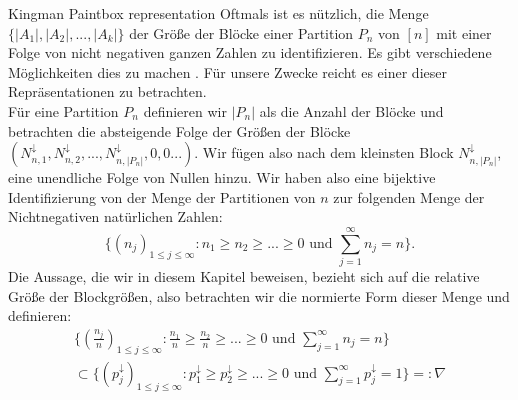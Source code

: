 \begin{section}{Kingman Paintbox representation}
Oftmals ist es nützlich, die Menge $\{|A_1|,|A_2|,...,|A_k|\}$ der Größe der Blöcke einer Partition $P_n$ von $[n]$ mit einer Folge von nicht negativen ganzen Zahlen zu identifizieren. Es gibt verschiedene Möglichkeiten dies zu machen \cite[Seite 15]{pitman2006combinatorial}. Für unsere Zwecke reicht es einer dieser Repräsentationen zu betrachten.
\\
Für eine Partition $P_n$ definieren wir $|P_n|$ als die Anzahl der Blöcke und betrachten die absteigende Folge der Größen der Blöcke $(N^\downarrow_{n,1},N^\downarrow_{n,2},...,N^\downarrow_{n,|P_n|},0,0...)$. Wir fügen also nach dem kleinsten Block $N^\downarrow_{n,|P_n|}$, eine unendliche Folge von Nullen hinzu. Wir haben also eine bijektive Identifizierung von der Menge der Partitionen von $n$ zur folgenden Menge der Nichtnegativen natürlichen Zahlen:
\[
 \{(n_j)_{1\leq j \leq \infty}: n_1 \geq n_2 \geq ... \geq 0 \text{ und } \sum_{j=1}^{\infty}{n_j} = n\}.
\]
Die Aussage, die wir in diesem Kapitel beweisen, bezieht sich auf die relative Größe der Blockgrößen, also betrachten wir die normierte Form dieser Menge und definieren: 
\begin{align}
 \{(\frac{n_j}{n})_{1\leq j \leq \infty}: \frac{n_1}{n} \geq \frac{n_2}{n} \geq ... \geq 0 \text{ und } \sum_{j=1}^{\infty}{n_j} = n\}\\
 \subset
  \{(p_j^{\downarrow})_{1\leq j \leq \infty}: p_1^{\downarrow} \geq p_2^{\downarrow} \geq ... \geq 0 \text{ und } \sum_{j=1}^{\infty}{p_j^{\downarrow}} = 1\} =: \nabla 
\end{align}


\end{section}
